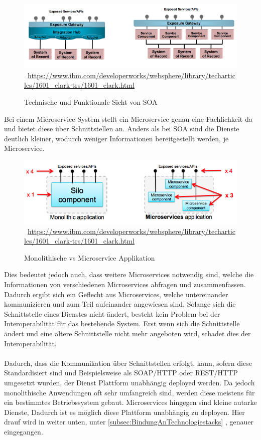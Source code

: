 \begin{figure}[htb]
    \centering 
    \includegraphics[width=\linewidth]{content/images/figure2}\
    \quelle\url{https://www.ibm.com/developerworks/websphere/library/techarticles/1601_clark-trs/1601_clark.html}
    \caption{Technische und Funktionale Sicht von SOA}
    \label{fig:TechnicalAndFunctionalViewsOfSOA} 
\end{figure}

Bei einem Microservice System stellt ein Microservice genau eine Fachlichkeit da und bietet diese über Schnittstellen an. Anders als bei SOA sind die Dienste deutlich kleiner, wodurch weniger Informationen bereitgestellt werden, je Microservice.
\begin{figure}[htb]
    \centering 
    \includegraphics[width=\linewidth]{content/images/MonolithicVsMicroservice}\
    \quelle\url{https://www.ibm.com/developerworks/websphere/library/techarticles/1601_clark-trs/1601_clark.html}
    \caption{Monolithische vs Microservice Applikation}
    \label{fig:MonolithicVsMicroservice} 
\end{figure}
\newpage
Dies bedeutet jedoch auch, dass weitere Microservices notwendig sind, welche die Informationen von verschiedenen Microservices abfragen und zusammenfassen. Dadurch ergibt sich ein Geflecht aus Microservices, welche untereinander kommunizieren und zum Teil aufeinander angewiesen sind. Solange sich die Schnittstelle eines Dienstes nicht ändert, besteht kein Problem bei der Interoperabilität für das bestehende System. Erst wenn sich die Schnittstelle ändert und eine ältere Schnittstelle nicht mehr angeboten wird, schadet dies der Interoperabilität.
\\\\
Dadurch, dass die Kommunikation über Schnittstellen erfolgt, kann, sofern diese Standardisiert sind und Beispielsweise als SOAP/HTTP oder REST/HTTP umgesetzt wurden, der Dienst Plattform unabhängig deployed werden. Da jedoch monolithische Anwendungen oft sehr umfangreich sind, werden diese meistens für ein bestimmtes Betriebssystem gebaut. Microservices hingegen sind kleine autarke Dienste, Dadurch ist es möglich diese Plattform unabhängig zu deployen. Hier drauf wird in weiter unten, unter \ref{subsec:BindungAnTechnologiestacks} , genauer eingegangen.

